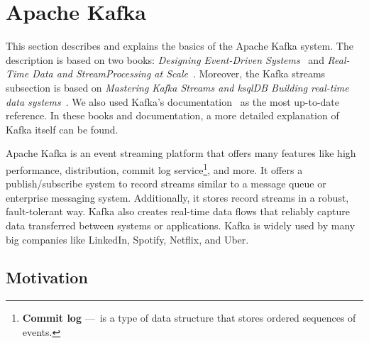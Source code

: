 \section{Apache Kafka}
\label{02:sec:title}

This section describes and explains the basics of the Apache Kafka system.
The description is based on two books: \emph{Designing Event-Driven Systems}~\cite{apacheKafkaDesignDistributedSystems} and \emph{Real-Time Data and StreamProcessing at Scale}~\cite{apacheKafkaDefinitiveGuide}.
Moreover, the Kafka streams subsection is based on \emph{Mastering Kafka Streams and ksqlDB Building real-time data systems}~\cite{kafkaStreamsBook}.
We also used Kafka's documentation~\cite{kafkaDocumentation} as the most up-to-date reference.
In these books and documentation, a more detailed explanation of Kafka itself can be found.

Apache Kafka is an event streaming platform that offers many features like high performance, distribution, commit log service\footnote{\textbf{Commit log}
---\ is a type of data structure that stores ordered sequences of events.}, and more.
It offers a publish/subscribe system to record streams similar to a message queue or enterprise messaging system.
Additionally, it stores record streams in a robust, fault-tolerant way.
Kafka also creates real-time data flows that reliably capture data transferred between systems or applications.
Kafka is widely used by many big companies like LinkedIn, Spotify, Netflix, and Uber.
\subsection{Motivation~\cite{02-bachelor-thesis}}
\label{kafka:motivation}

